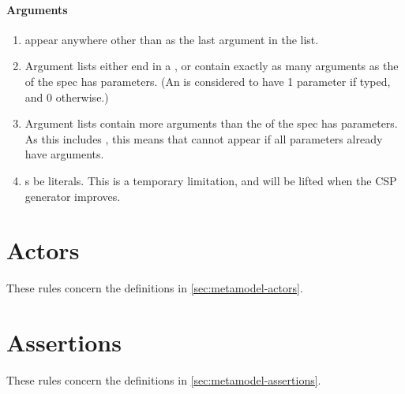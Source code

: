 \paragraph{Arguments}

\begin{enumerate}
\item
	\mrestargument{} \rfcmustnot{} appear anywhere other than as the last
	argument in the list.
\item
	Argument lists \rfcmust{} either end in a \mrestargument, or
	contain exactly as many arguments as the \mmessagetopic{} of the spec
	has parameters.  (An \meventtopic{} is considered to have 1 parameter
	if typed, and 0 otherwise.)
\item
	Argument lists \rfcmustnot{} contain more
	arguments than the \mmessagetopic{} of the spec has parameters.
	As this includes \mrestargument, this means that \mrestargument{} cannot
	appear if all parameters already have arguments.
\item
	\mexpressionargument s \rfcshould{} be literals.  This is a temporary
	limitation, and will be lifted when the CSP generator improves.
\end{enumerate}

\section{Actors}\label{sec:wf-actors}

These rules concern the definitions in \cref{sec:metamodel-actors}.

\section{Assertions}\label{sec:wf-assertions}

These rules concern the definitions in \cref{sec:metamodel-assertions}.

